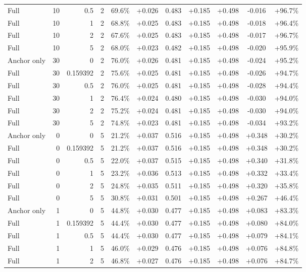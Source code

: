 \begin{table}[htbp]
\begin{tabular}{lrrrccccccc}
Full & 10 & 0.5 & 2 & 69.6\% & +0.026 & 0.483 & +0.185 & +0.498 & -0.016 & +96.7\% \\
Full & 10 & 1 & 2 & 68.8\% & +0.025 & 0.483 & +0.185 & +0.498 & -0.018 & +96.4\% \\
Full & 10 & 2 & 2 & 67.6\% & +0.025 & 0.483 & +0.185 & +0.498 & -0.017 & +96.7\% \\
Full & 10 & 5 & 2 & 68.0\% & +0.023 & 0.482 & +0.185 & +0.498 & -0.020 & +95.9\% \\
Anchor only & 30 & 0 & 2 & 76.0\% & +0.026 & 0.481 & +0.185 & +0.498 & -0.024 & +95.2\% \\
Full & 30 & 0.159392 & 2 & 75.6\% & +0.025 & 0.481 & +0.185 & +0.498 & -0.026 & +94.7\% \\
Full & 30 & 0.5 & 2 & 76.0\% & +0.025 & 0.481 & +0.185 & +0.498 & -0.028 & +94.4\% \\
Full & 30 & 1 & 2 & 76.4\% & +0.024 & 0.480 & +0.185 & +0.498 & -0.030 & +94.0\% \\
Full & 30 & 2 & 2 & 75.2\% & +0.024 & 0.481 & +0.185 & +0.498 & -0.030 & +94.0\% \\
Full & 30 & 5 & 2 & 74.8\% & +0.023 & 0.481 & +0.185 & +0.498 & -0.034 & +93.2\% \\
Anchor only & 0 & 0 & 5 & 21.2\% & +0.037 & 0.516 & +0.185 & +0.498 & +0.348 & +30.2\% \\
Full & 0 & 0.159392 & 5 & 21.2\% & +0.037 & 0.516 & +0.185 & +0.498 & +0.348 & +30.2\% \\
Full & 0 & 0.5 & 5 & 22.0\% & +0.037 & 0.515 & +0.185 & +0.498 & +0.340 & +31.8\% \\
Full & 0 & 1 & 5 & 23.2\% & +0.036 & 0.513 & +0.185 & +0.498 & +0.332 & +33.4\% \\
Full & 0 & 2 & 5 & 24.8\% & +0.035 & 0.511 & +0.185 & +0.498 & +0.320 & +35.8\% \\
Full & 0 & 5 & 5 & 30.8\% & +0.031 & 0.501 & +0.185 & +0.498 & +0.267 & +46.4\% \\
Anchor only & 1 & 0 & 5 & 44.8\% & +0.030 & 0.477 & +0.185 & +0.498 & +0.083 & +83.3\% \\
Full & 1 & 0.159392 & 5 & 44.4\% & +0.030 & 0.477 & +0.185 & +0.498 & +0.080 & +84.0\% \\
Full & 1 & 0.5 & 5 & 44.4\% & +0.030 & 0.477 & +0.185 & +0.498 & +0.079 & +84.1\% \\
Full & 1 & 1 & 5 & 46.0\% & +0.029 & 0.476 & +0.185 & +0.498 & +0.076 & +84.8\% \\
Full & 1 & 2 & 5 & 46.8\% & +0.027 & 0.476 & +0.185 & +0.498 & +0.076 & +84.7\% \\

\end{tabular}
\end{table}

